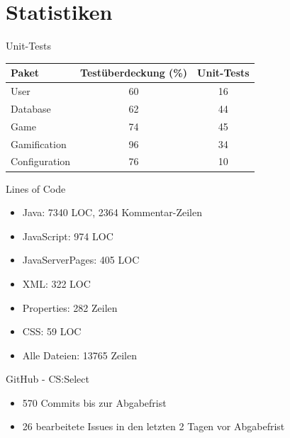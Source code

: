 \documentclass[xcolor=dvipsnames]{beamer}
\begin{document}
\renewcommand{\arraystretch}{1.5}

\section{Statistiken}
\begin{frame}{Unit-Tests}
  \begin{center}
    \begin{tabular}{ | l | c | c | }
      \hline
      Paket & Testüberdeckung (\%) & Unit-Tests \\ \hline
      User & 60 & 16 \\
      Database & 62 & 44 \\
      Game & 74 & 45 \\
      Gamification & 96 & 34 \\
      Configuration & 76 & 10 \\
      \hline
    \end{tabular}
  \end{center}
\end{frame}

\begin{frame}{Lines of Code}
  \begin{itemize}
    \item Java: 7340 LOC, 2364 Kommentar-Zeilen \\
    \item JavaScript: 974 LOC \\
    \item JavaServerPages: 405 LOC \\
    \item XML: 322 LOC \\
    \item Properties: 282 Zeilen \\
    \item CSS: 59 LOC \\
    \item Alle Dateien: 13765 Zeilen \\
  \end{itemize}
\end{frame}

\begin{frame}{GitHub - CS:Select}
  \begin{itemize}
    \item 570 Commits bis zur Abgabefrist \\
    \item 26 bearbeitete Issues in den letzten 2 Tagen vor Abgabefrist \\
  \end{itemize}
\end{frame}
\end{document}
